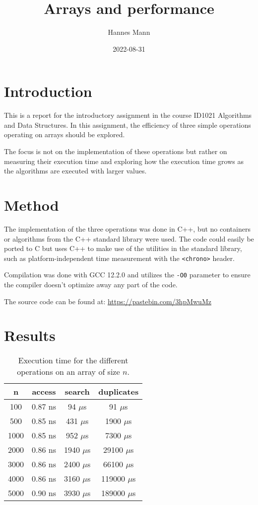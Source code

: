 \documentclass[a4paper,11pt]{article}
\begin{document}
\title{
    \textbf{Arrays and performance}
}
\author{Hannes Mann}
\date{2022-08-31}

\maketitle

\section*{Introduction}

This is a report for the introductory assignment in the course ID1021 Algorithms and Data Structures. In this assignment, the efficiency of three simple operations operating on arrays should be explored.

The focus is not on the implementation of these operations but rather on measuring their execution time and exploring how the execution time grows as the algorithms are executed with larger values.

\section*{Method}

The implementation of the three operations was done in C++, but no containers or algorithms from the C++ standard library were used. The code could easily be ported to C but uses C++ to make use of the utilities in the standard library, such as platform-independent time measurement with the {\tt <chrono>} header.

Compilation was done with GCC 12.2.0 and utilizes the {\tt -O0} parameter to ensure the compiler doesn't optimize away any part of the code.

The source code can be found at: \href{https://pastebin.com/3hpMwuMz}{https://pastebin.com/3hpMwuMz}

\section*{Results}

\begin{table}[H]
\centering
\begin{tabular}{|c|c|c|c|}
\hline
\textbf{n} & \textbf{access} & \textbf{search} & \textbf{duplicates} \\
\hline
  100 & 0.87 ns & 94 $\mu$s & 91 $\mu$s \\
  500 & 0.85 ns & 431 $\mu$s & 1900 $\mu$s \\
  1000 & 0.85 ns & 952 $\mu$s & 7300 $\mu$s \\
  2000 & 0.86 ns & 1940 $\mu$s & 29100 $\mu$s \\
  3000 & 0.86 ns & 2400 $\mu$s & 66100 $\mu$s \\
  4000 & 0.86 ns & 3160 $\mu$s & 119000 $\mu$s \\
  5000 & 0.90 ns & 3930 $\mu$s & 189000 $\mu$s \\
\hline
\end{tabular}
\caption{Execution time for the different operations on an array of size $n$.}
\label{tab:table1}
\end{table}
\end{document}
